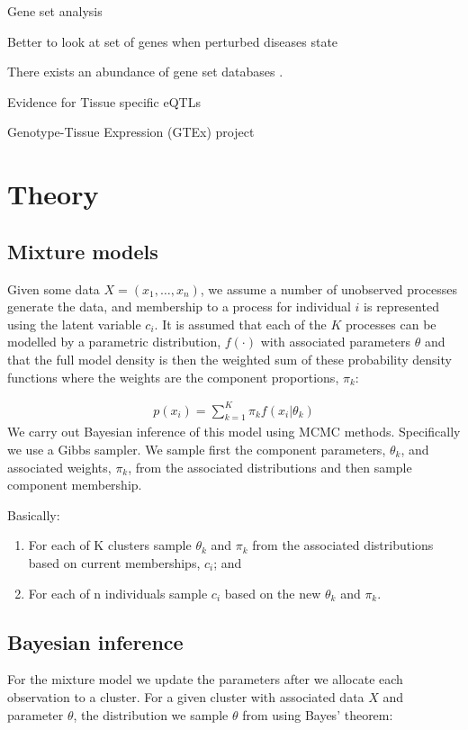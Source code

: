 \documentclass[11pt]{article} %
\begin{document}
	Gene set analysis \cite{mooney_gene_2015} \cite{dudbridge_power_2013}

	Better to look at set of genes when perturbed diseases state \cite{wray_research_2014}\cite{nica_expression_2013}
	
	There exists an abundance of gene set databases . 
	
	Evidence for Tissue specific eQTLs \cite{grundberg_mapping_2012} 
	
	Genotype-Tissue Expression (GTEx) project \cite{lonsdale_genotype-tissue_2013}  \cite{burgess_gene_2017}

	\section{Theory}
	\subsection{Mixture models} \label{mixture_models}
	Given some data $X = (x_1, \ldots, x_n)$, we assume a number of unobserved processes generate the data, and membership to a process for individual $i$ is represented using the latent variable $c_i$. It is assumed that each of the $K$ processes can be modelled by a parametric distribution, $f(\cdot)$ with associated parameters $\theta$ and that the full model density is then the weighted sum of these probability density functions where the weights are the component proportions, $\pi_k$:
	
	\begin{align}
	p(x_i) = \sum_{k=1}^K \pi_k f(x_i | \theta_k)
	\end{align}
	We carry out Bayesian inference of this model using MCMC methods. Specifically we use a Gibbs sampler. We sample first the component parameters, $\theta_k$, and associated weights, $\pi_k$, from the associated distributions and then sample component membership.
	
	Basically:
	\begin{enumerate}
		\item For each of K clusters sample $\theta_k$ and $\pi_k$ from the associated distributions based on current memberships, $c_i$; and
		\item For each of n individuals sample $c_i$ based on the new $\theta_k$ and $\pi_k$.
	\end{enumerate}

	\subsection{Bayesian inference}	
	For the mixture model we update the parameters after we allocate each observation to a cluster. For a given cluster with associated data $X$ and parameter $\theta$, the distribution we sample $\theta$ from using Bayes' theorem:
	
\end{document}
